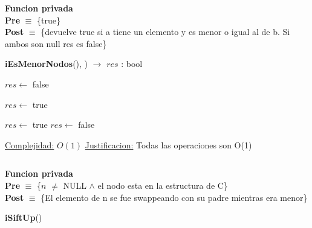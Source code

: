 \begin{Algoritmos}
\begin{algorithm}[H]
\begin{algorithmic}[1]
\end{algorithmic}
\end{algorithm}

$ $\newline


\textbf{Funcion privada}\\
\textbf{Pre} $\equiv$ \{true\}\\%
\textbf{Post} $\equiv$ \{devuelve true si a tiene un elemento y es menor o igual al de b. Si ambos son null res es false\}%
\begin{algorithm}[H]
{\textbf{iEsMenorNodos}(), ) $\to$ $res$ : bool}
\begin{algorithmic}[1]


            \State $res \gets$ false
        \Else

                \State $res \gets$ true
                
            \Else

                    \State $res \gets$ true
                \EndIf
            \EndIf
        \EndIf
    \Else
        \State $res \gets$ false
    \EndIf


    \medskip
    \Statex \underline{Complejidad:} $O(1)$
    \Statex \underline{Justificacion:} Todas las operaciones son O(1)

\end{algorithmic}
\end{algorithm}



$ $\newline

\textbf{Funcion privada}\\
\textbf{Pre} $\equiv$ \{$n$ $\neq$ NULL $\land$ el nodo esta en la estructura de C\}\\%
\textbf{Post} $\equiv$ \{El elemento de n se fue swappeando con su padre mientras era menor\}%
\begin{algorithm}[H]
{\textbf{iSiftUp}()}
\begin{algorithmic}[1]


\end{algorithmic}
\end{algorithm}
\end{Algoritmos}
